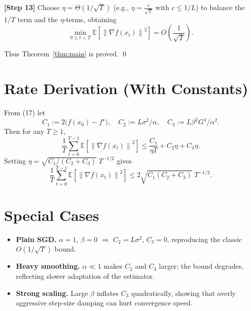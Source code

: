 \documentclass{article}
\newcommand{\E}{\mathbb{E}}
\newcommand{\norm}[1]{\left\lVert#1\right\rVert}
\begin{document}
\noindent\textbf{[Step 13]} Choose $\eta = \Theta(1/\sqrt{T})$ (e.g., $\eta = \frac{c}{\sqrt{T}}$ with $c\le 1/L$) to balance the $1/T$ term and the $\eta$‑terms, obtaining
\[
\min_{0\le t<T}\E\!\left[\norm{\nabla f(x_t)}^{2}\right]=O\!\left(\frac{1}{\sqrt{T}}\right).
\tag{18}
\]

Thus Theorem~\ref{thm:main} is proved. \qed

\section*{Rate Derivation (With Constants)}
From (17) let
\[
C_1:=2\bigl(f(x_0)-f^\star\bigr),\quad
C_2:=L\sigma^{2}/\alpha,\quad
C_3:=L\beta^{2}G^{4}/\alpha^{2}.
\]
Then for any $T\ge1$,
\[
\frac{1}{T}\sum_{t=0}^{T-1}\E\!\left[\norm{\nabla f(x_t)}^{2}\right]
\le \frac{C_1}{\eta T}+C_2\eta+C_3\eta .
\]
Setting $\eta = \sqrt{C_1/(C_2+C_3)}\;T^{-1/2}$ gives
\[
\frac{1}{T}\sum_{t=0}^{T-1}\E\!\left[\norm{\nabla f(x_t)}^{2}\right]
\le 2\sqrt{C_1(C_2+C_3)}\;T^{-1/2}.
\]

\section*{Special Cases}
\begin{itemize}
\item \textbf{Plain SGD.} $\alpha=1$, $\beta=0$ $\Rightarrow$ $C_2=L\sigma^{2}$, $C_3=0$, reproducing the classic $O(1/\sqrt{T})$ bound.
\item \textbf{Heavy smoothing.} $\alpha\ll1$ makes $C_2$ and $C_3$ larger; the bound degrades, reflecting slower adaptation of the estimator.
\item \textbf{Strong scaling.} Large $\beta$ inflates $C_3$ quadratically, showing that overly aggressive step‑size damping can hurt convergence speed.
\end{itemize}
\end{document}
